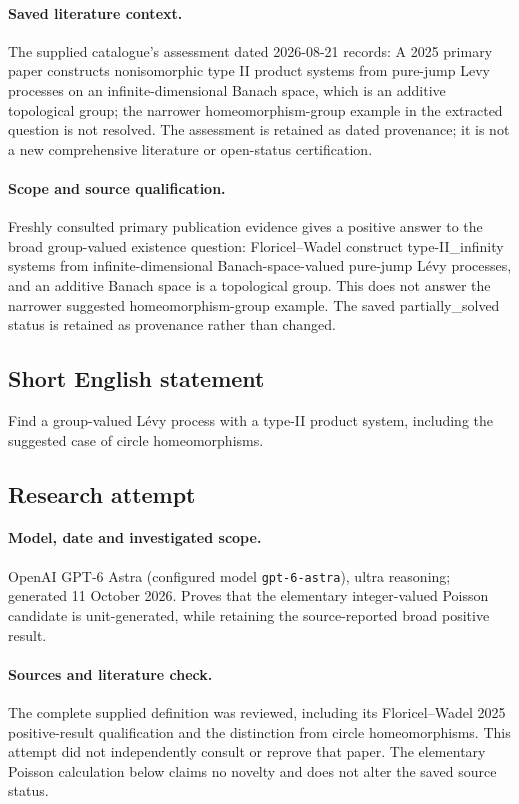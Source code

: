 \documentclass[11pt]{article}
\begin{document}
\paragraph{Saved literature context.} The supplied catalogue's assessment dated 2026-08-21 records: A 2025 primary paper constructs nonisomorphic type II product systems from pure-jump Levy processes on an infinite-dimensional Banach space, which is an additive topological group; the narrower homeomorphism-group example in the extracted question is not resolved. The assessment is retained as dated provenance; it is not a new comprehensive literature or open-status certification.
\paragraph{Scope and source qualification.}Freshly consulted primary publication evidence gives a positive answer to the broad group-valued existence question: Floricel--Wadel construct type-II_infinity systems from infinite-dimensional Banach-space-valued pure-jump Lévy processes, and an additive Banach space is a topological group. This does not answer the narrower suggested homeomorphism-group example. The saved partially_solved status is retained as provenance rather than changed.
\subsection{Short English statement}
Find a group-valued Lévy process with a type-II product system, including the suggested case of circle homeomorphisms.
\subsection{Research attempt}
\paragraph{Model, date and investigated scope.}
OpenAI GPT-6 Astra (configured model \texttt{gpt-6-astra}), ultra reasoning; generated 11 October 2026. Proves that the elementary integer-valued Poisson candidate is unit-generated, while retaining the source-reported broad positive result.

\paragraph{Sources and literature check.}
The complete supplied definition was reviewed, including its Floricel–Wadel 2025 positive-result qualification and the distinction from circle homeomorphisms. This attempt did not independently consult or reprove that paper. The elementary Poisson calculation below claims no novelty and does not alter the saved source status.
\end{document}
